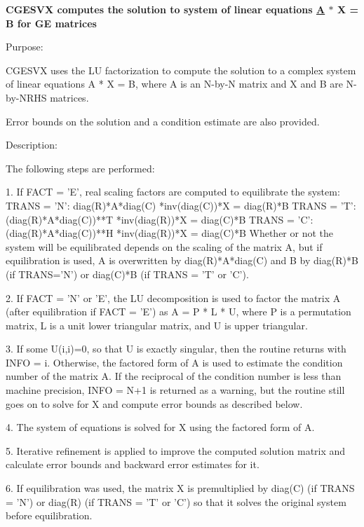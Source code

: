 {\bfseries  C\+G\+E\+S\+V\+X computes the solution to system of linear equations \hyperlink{classA}{A} $\ast$ X = B for G\+E matrices} 

 \begin{DoxyParagraph}{Purpose\+: }
\begin{DoxyVerb} CGESVX uses the LU factorization to compute the solution to a complex
 system of linear equations
    A * X = B,
 where A is an N-by-N matrix and X and B are N-by-NRHS matrices.

 Error bounds on the solution and a condition estimate are also
 provided.\end{DoxyVerb}
 
\end{DoxyParagraph}
\begin{DoxyParagraph}{Description\+: }
\begin{DoxyVerb} The following steps are performed:

 1. If FACT = 'E', real scaling factors are computed to equilibrate
    the system:
       TRANS = 'N':  diag(R)*A*diag(C)     *inv(diag(C))*X = diag(R)*B
       TRANS = 'T': (diag(R)*A*diag(C))**T *inv(diag(R))*X = diag(C)*B
       TRANS = 'C': (diag(R)*A*diag(C))**H *inv(diag(R))*X = diag(C)*B
    Whether or not the system will be equilibrated depends on the
    scaling of the matrix A, but if equilibration is used, A is
    overwritten by diag(R)*A*diag(C) and B by diag(R)*B (if TRANS='N')
    or diag(C)*B (if TRANS = 'T' or 'C').

 2. If FACT = 'N' or 'E', the LU decomposition is used to factor the
    matrix A (after equilibration if FACT = 'E') as
       A = P * L * U,
    where P is a permutation matrix, L is a unit lower triangular
    matrix, and U is upper triangular.

 3. If some U(i,i)=0, so that U is exactly singular, then the routine
    returns with INFO = i. Otherwise, the factored form of A is used
    to estimate the condition number of the matrix A.  If the
    reciprocal of the condition number is less than machine precision,
    INFO = N+1 is returned as a warning, but the routine still goes on
    to solve for X and compute error bounds as described below.

 4. The system of equations is solved for X using the factored form
    of A.

 5. Iterative refinement is applied to improve the computed solution
    matrix and calculate error bounds and backward error estimates
    for it.

 6. If equilibration was used, the matrix X is premultiplied by
    diag(C) (if TRANS = 'N') or diag(R) (if TRANS = 'T' or 'C') so
    that it solves the original system before equilibration.\end{DoxyVerb}
 
\end{DoxyParagraph}

